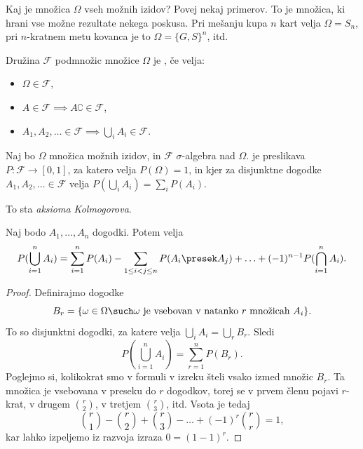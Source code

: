 
\begin{vo}{Kaj je množica $\Omega$ vseh možnih izidov? Povej nekaj primerov.}
  To je množica, ki hrani vse možne rezultate nekega poskusa.
  Pri mešanju kupa $n$ kart velja $\Omega = S_n$, pri $n$-kratnem metu kovanca
  je to $\Omega = \{G, S\}^n$, itd.
\end{vo}

\begin{definicija}
  Družina $\mathcal{F}$ podmnožic množice $\Omega$ je ,
  če velja:
  \begin{itemize}
  \item $\Omega \in \mathcal{F}$,
  \item $A \in \mathcal{F} \implies A\complement \in \mathcal{F}$,
  \item $A_1, A_2, \ldots \in \mathcal{F} \implies \bigcup_{i} A_i \in \mathcal{F}$.
  \end{itemize}
\end{definicija}

\begin{definicija}
  Naj bo $\Omega$ množica možnih izidov, in $\mathcal{F}$ $\sigma$-algebra nad
  $\Omega$.
   je preslikava $P: \mathcal{F} \to [0,1]$, za katero velja
  $P(\Omega) = 1$, in kjer za disjunktne dogodke $A_1, A_2, \ldots \in
  \mathcal{F}$ velja $P(\bigcup_i A_i) = \sum_i P(A_i)$.
\end{definicija}

\begin{opomba}
  To sta \emph{aksioma Kolmogorova}.
\end{opomba}


\begin{izrek}
  Naj bodo $A_1, \ldots, A_n$ dogodki.
  Potem velja
  \[
    P(\bigcup_{i=1}^n A_i) = \sum_{i=1}^n P(A_i) - \sum_{1 \le i < j \le n}
    P(A_i \presek A_j) + \ldots + (-1)^{n-1} P(\bigcap_{i=1}^n A_i).
  \]
\end{izrek}

\begin{proof}
  Definirajmo dogodke
  \[
    B_r = \{\omega \in \Omega \such \text{$\omega$ je vsebovan v natanko $r$
      množicah $A_i$} \}.
  \]
  To so disjunktni dogodki, za katere velja $\bigcup_i A_i = \bigcup_r B_r$.
  Sledi
  \[
    P(\bigcup_{i=1}^n A_i) = \sum_{r=1}^n P(B_r).
  \]
  Poglejmo si, kolikokrat smo v formuli v izreku šteli vsako izmed množic $B_r$.
  Ta množica je vsebovana v preseku do $r$ dogodkov, torej se v prvem členu
  pojavi $r$-krat, v drugem $\binom{r}{2}$, v tretjem $\binom{r}{3}$, itd.
  Vsota je tedaj
  \[
    \binom{r}{1} - \binom{r}{2} + \binom{r}{3} - \ldots + (-1)^r \binom{r}{r} = 1,
  \]
  kar lahko izpeljemo iz razvoja izraza $0 = (1 - 1)^r$.
\end{proof}


